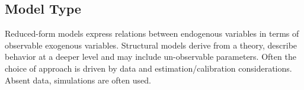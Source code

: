 \documentclass[11pt]{article}
\begin{document}
\begin{center}
\end{center}

\subsection{Model Type}
Reduced-form models express relations between endogenous variables in terms of observable exogenous variables. Structural models derive from a theory, describe behavior at a deeper level and may include un-observable parameters. Often the choice of approach is driven by data and estimation/calibration considerations.  Absent data, simulations are often used.
\end{document}
